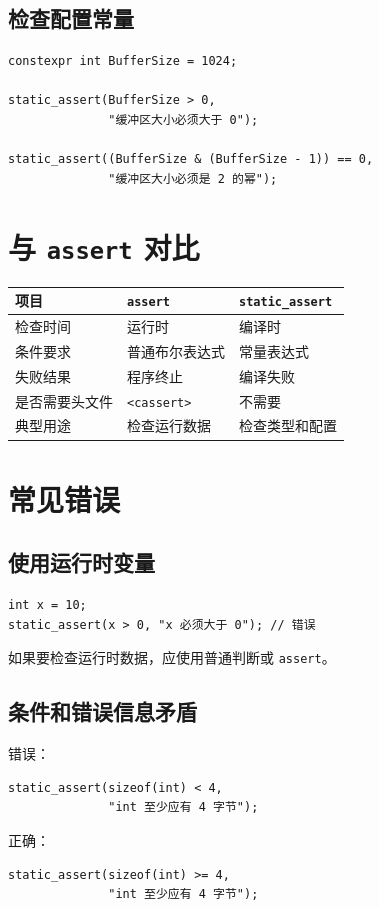 \documentclass[UTF8,12pt,a4paper]{ctexart}
\begin{document}
\subsection{检查配置常量}
\begin{lstlisting}
constexpr int BufferSize = 1024;

static_assert(BufferSize > 0,
              "缓冲区大小必须大于 0");

static_assert((BufferSize & (BufferSize - 1)) == 0,
              "缓冲区大小必须是 2 的幂");
\end{lstlisting}


\section{与 \texttt{assert} 对比}
\begin{center}
\begin{tabular}{lll}
\toprule
项目 & \texttt{assert} & \texttt{static\_assert} \\
\midrule
检查时间 & 运行时 & 编译时 \\
条件要求 & 普通布尔表达式 & 常量表达式 \\
失败结果 & 程序终止 & 编译失败 \\
是否需要头文件 & \texttt{<cassert>} & 不需要 \\
典型用途 & 检查运行数据 & 检查类型和配置 \\
\bottomrule
\end{tabular}
\end{center}

\section{常见错误}
\subsection{使用运行时变量}
\begin{lstlisting}
int x = 10;
static_assert(x > 0, "x 必须大于 0"); // 错误
\end{lstlisting}
如果要检查运行时数据，应使用普通判断或 \texttt{assert}。

\subsection{条件和错误信息矛盾}
错误：
\begin{lstlisting}
static_assert(sizeof(int) < 4,
              "int 至少应有 4 字节");
\end{lstlisting}
正确：
\begin{lstlisting}
static_assert(sizeof(int) >= 4,
              "int 至少应有 4 字节");
\end{lstlisting}
\end{document}
